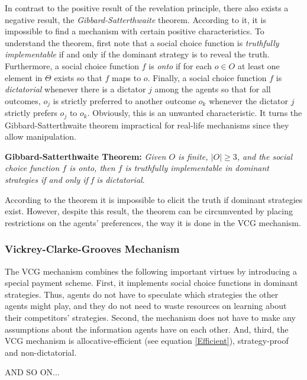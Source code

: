 In contrast to the positive result of the revelation principle,
there also exists a negative result, the
\emph{Gibbard-Satterthwaite} theorem. According to it, it is
impossible to find a mechanism with certain positive
characteristics. To understand the theorem, first note that a
social choice function is \emph{truthfully implementable} if and
only if the dominant strategy is to reveal the truth. Furthermore,
a social choice function $f$ is \emph{onto} if for each $o \in O$
at least one element in $\Theta$ exists so that $f$ maps to $o$.
Finally, a social choice function $f$ is \emph{dictatorial}
whenever there is a dictator $j$ among the agents so that for all
outcomes, $o_j$ is strictly preferred to another outcome $o_k$
whenever the dictator $j$ strictly prefers $o_j$ to $o_k$.
Obviously, this is an unwanted characteristic. It turns the
Gibbard-Satterthwaite theorem impractical for real-life mechanisms
since they allow manipulation.

\textbf{Gibbard-Satterthwaite Theorem:} \emph{Given $O$ is finite,
$|O|\geq 3$, and the social choice function $f$ is onto, then $f$
is truthfully implementable in dominant strategies if and only if
f is dictatorial}.

According to the theorem it is impossible to elicit the truth if
dominant strategies exist. However, despite this result, the
theorem can be circumvented by placing restrictions on the agents'
preferences, the way it is done in the VCG mechanism.

\subsubsection{Vickrey-Clarke-Grooves Mechanism}
The VCG mechanism combines the following important virtues by
introducing a special payment scheme. First, it implements social
choice functions in dominant strategies. Thus, agents do not have
to speculate which strategies the other agents might play, and
they do not need to waste resources on learning about their
competitors' strategies. Second, the mechanism does not have to
make any assumptions about the information agents have on each
other. And, third, the VCG mechanism is allocative-efficient (see
equation \ref{Efficient}), strategy-proof and non-dictatorial.

AND SO ON... 